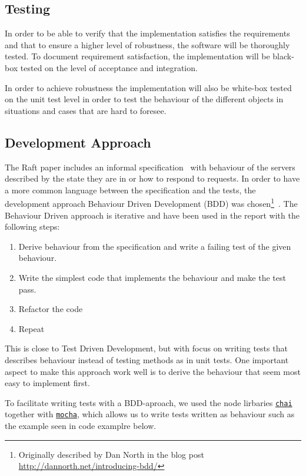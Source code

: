 
\subsection{Testing} %
\label{sub:testing}

In order to be able to verify that the implementation satisfies the requirements and that to ensure a higher level of robustness, the software will be thoroughly tested. To document requirement satisfaction, the implementation will be black-box tested on the level of acceptance and integration.

In order to achieve robustness the implementation will also be white-box tested on the unit test level in order to test the behaviour of the different objects in situations and cases that are hard to foresee.


\subsection{Development Approach}
\label{sub:development_approach}

The Raft paper includes an informal specification~\cite[page~4]{Raft} with behaviour of the servers described by the state they are in or how to respond to requests. In order to have a more common language between the specification and the tests, the development approach Behaviour Driven Development (BDD) was chosen\footnote{Originally described by Dan North in the blog post \url{http://dannorth.net/introducing-bdd/}}~\cite{bddpaper}. The Behaviour Driven approach is iterative and have been used in the report with the following steps:

\begin{enumerate}
    \item Derive behaviour from the specification and write a failing test of the given behaviour.
    \item Write the simplest code that implements the behaviour and make the test pass.
    \item Refactor the code
    \item Repeat
\end{enumerate}

This is close to Test Driven Development, but with focus on writing tests that describes behaviour instead of testing methods as in unit tests.
One important aspect to make this approach work well is to derive the behaviour that seem most easy to implement first.

To facilitate writing tests with a BDD-aproach, we used the node lirbaries \href{http://chaijs.com/}{\tt chai} together with \href{http://mochajs.org}{\tt mocha}, which allows us to write tests written as behaviour such as the example seen in code examplre below.





